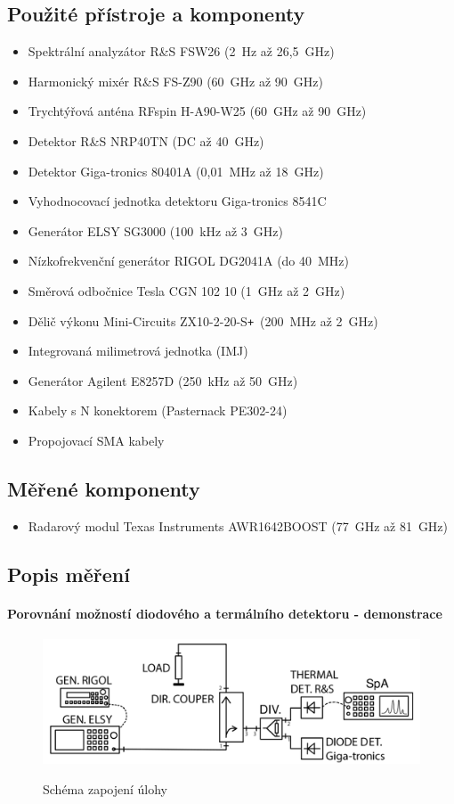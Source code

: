 \documentclass[11pt,a4paper]{article}
\newcommand{\plus}{{\texttt{+}}}
\begin{document}
\subsection*{Použité přístroje a komponenty}
\begin{itemize}
    \item Spektrální analyzátor R\&S FSW26 (2~Hz až 26,5~GHz)
    \item Harmonický mixér R\&S FS-Z90 (60~GHz až 90~GHz)
    \item Trychtýřová anténa RFspin H-A90-W25 (60~GHz až 90~GHz)
    \item Detektor R\&S NRP40TN (DC až 40~GHz)
    \item Detektor Giga-tronics 80401A (0,01~MHz až 18~GHz)
    \item Vyhodnocovací jednotka detektoru Giga-tronics 8541C
    \item Generátor ELSY SG3000 (100~kHz až 3~GHz)
    \item Nízkofrekvenční generátor RIGOL DG2041A (do 40~MHz)
    \item Směrová odbočnice Tesla CGN 102 10 (1~GHz až 2~GHz)
    \item Dělič výkonu Mini-Circuits ZX10-2-20-S\plus\ (200~MHz až 2~GHz)
    \item Integrovaná milimetrová jednotka (IMJ)
    \item Generátor Agilent E8257D (250~kHz až 50~GHz)
    \item Kabely s N konektorem (Pasternack PE302-24)
    \item Propojovací SMA kabely
\end{itemize}

\subsection*{Měřené komponenty}
\begin{itemize}
    \item Radarový modul Texas Instruments AWR1642BOOST (77~GHz až 81~GHz)
\end{itemize}

\subsection*{Popis měření}

\paragraph*{Porovnání možností diodového a termálního detektoru - demonstrace} \lipsum[1]
\begin{figure}[!ht]
    \centering
    \includegraphics[width=.8\textwidth]{src/task1-zapojeni.png}
    \label{fig:task1-zapojeni}
    \caption{Schéma zapojení úlohy}
\end{figure}
\end{document}
